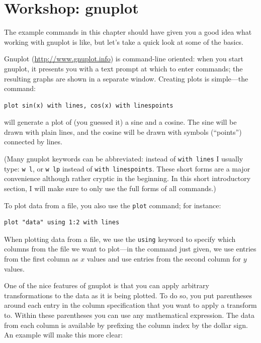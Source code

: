 \section{Workshop: gnuplot}


The example commands in this chapter should have given you a good idea
what working with gnuplot is like, but let's take a quick look at some
of the basics.

Gnuplot (\url{http://www.gnuplot.info}) is command-line oriented: when
you start gnuplot, it presents you with a text prompt at which to
enter commands; the resulting graphs are shown in a separate window.
Creating plots is simple---the command:

\begin{verbatim}
plot sin(x) with lines, cos(x) with linespoints
\end{verbatim}

will generate a plot of (you guessed it) a sine and a cosine. The
sine will be drawn with plain lines, and the cosine will be drawn
with symbols (``points'') connected by lines.

(Many gnuplot keywords can be abbreviated: instead of \texttt{with
  lines} I usually type: \texttt{w l}, or \texttt{w lp} instead of
\texttt{with linespoints}. These short forms are a major convenience
although rather cryptic in the beginning. In this short introductory
section, I will make sure to only use the full forms of all commands.)

To plot data from a file, you also use the \texttt{plot} command;
for instance:

\begin{verbatim}
plot "data" using 1:2 with lines
\end{verbatim}

When plotting data from a file, we use the \texttt{using} keyword to
specify which columns from the file we want to plot---in the command
just given, we use entries from the first column as $x$ values and use
entries from the second column for $y$ values.

One of the nice features of gnuplot is that you can apply arbitrary
transformations to the data as it is being plotted. To do so, you put
parentheses around each entry in the column specification that you
want to apply a transform to. Within these parentheses you can use any
mathematical expression. The data from each column is available by
prefixing the column index by the dollar sign. An example will make
this more clear:

